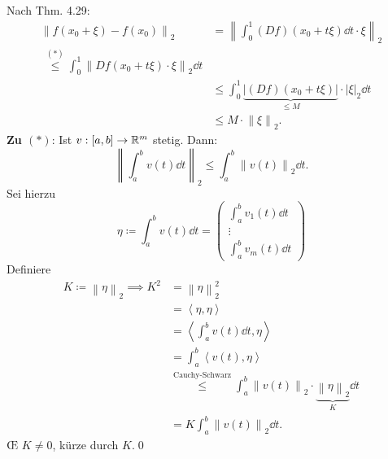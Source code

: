 \documentclass[sectionformat=aufgabe]{gadsescript}
\begin{document}
\begin{proof*}[Schrankensatz]
        Nach Thm. 4.29:
        \begin{align*}
                \left\| f(x_0 + \xi) - f(x_0) \right\| _2 &= \left\| \int_{0}^{1} \left( Df \right) \left( x_0 + t\xi \right) \dd t \cdot \xi \right\| _2 \\
                ~ \overset{(*)}{\leq } \int_{0}^{1} \left\| Df (x_0 + t\xi) \cdot \xi \right\| _2 \dd t \\
                ~ & \leq \int_{0}^{1} \underbrace{\left| (Df) (x_0 + t\xi) \right| }_{\leq M} \cdot \left| \xi \right| _2 \dd t \\
                ~ & \leq M \cdot \left\| \xi \right\| _2.
        \end{align*}
        \textbf{Zu $ (*) $}: Ist $ v : [a, b] \to \mathbb{R} ^m $ stetig.
        Dann:
        \[
                \left\| \int_{a}^{b} v(t) \dd t \right\| _{2} \leq \int_{a}^{b} \left\| v(t) \right\| _2 \dd t.
        \]
        Sei hierzu
        \[
                \eta \coloneqq \int_{a}^{b} v(t) \dd t = \begin{pmatrix} \int_{a}^{b} v_1(t) \dd t \\ \vdots \\ \int_{a}^{b} v_m (t) \dd t \end{pmatrix}
        \]
        Definiere
        \begin{align*}
                K \coloneqq \left\| \eta \right\| _2 \implies K^2 &= \left\| \eta \right\| _2^2 \\
                ~ &= \left< \eta, \eta \right> \\
                ~ &= \left< \int_{a}^{b} v(t) \dd t, \eta \right> \\
                  &= \int_{a}^{b} \left< v(t), \eta \right> \\
                  & \overset{\text{Cauchy-Schwarz} }{\leq } \int_{a}^{b} \left\| v(t) \right\| _2 \cdot \underbrace{\left\| \eta \right\| _2}_{K} \dd t \\
                  &= K \int_{a}^{b}\left\| v(t) \right\| _2 \dd t.
        \end{align*}
        \OE{} $ K \neq 0 $, kürze durch $ K $.\qed
\end{proof*}
\end{document}
